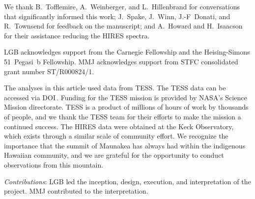 \documentclass[11pt,twocolumn,tighten,linenumbers]{aastex7}
\begin{document}
\begin{acknowledgements}
  We thank B.~Tofflemire, A.~Weinberger, and L.~Hillenbrand for
  conversations that significantly informed this work; J.~Spake,
  J.~Winn, J.-F~Donati, and R.~Townsend for feedback on the
  manuscript; and A.~Howard and H.~Isaacson for their assistance
  reducing the HIRES spectra.

  LGB acknowledges support from the Carnegie Fellowship and the
  Heising-Simons 51~Pegasi~b Fellowship.
  MMJ acknowledges support from STFC consolidated grant
  number ST/R000824/1.

  The analyses in this article used data from TESS.  
  The TESS data can be accessed via
  DOI\,.
  Funding for the TESS mission is provided by NASA’s Science Mission
  directorate.
  TESS is a product of millions of hours of work by thousands of
  people, and we thank the TESS team for their efforts to make the
  mission a continued success.
  The HIRES data were obtained at the Keck Observatory, which exists
  through a similar scale of community effort.
  We recognize the importance that the summit of Maunakea has always
  had within the indigenous Hawaiian community, and we are grateful
  for the opportunity to conduct observations from this mountain.
\end{acknowledgements}

{\it \large Contributions}: 
LGB led the inception, design, execution, and interpretation of the
project.  MMJ contributed to the interpretation.







\end{document}
